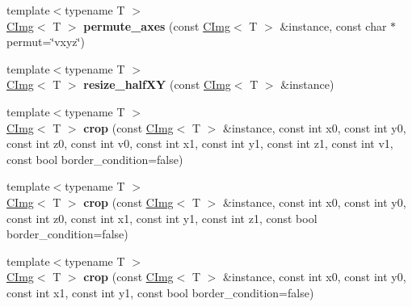 \begin{DoxyCompactItemize}
\item 
\hypertarget{namespacecimg__library_a95ef4b158f977b971aee77f3c5e05891}{{\footnotesize template$<$typename T $>$ }\\\hyperlink{structcimg__library_1_1_c_img}{C\-Img}$<$ T $>$ {\bfseries permute\-\_\-axes} (const \hyperlink{structcimg__library_1_1_c_img}{C\-Img}$<$ T $>$ \&instance, const char $\ast$permut=\char`\"{}vxyz\char`\"{})}\label{namespacecimg__library_a95ef4b158f977b971aee77f3c5e05891}

\item 
\hypertarget{namespacecimg__library_a7d35556fef7e0e3f9e4b15ee2abd7fb1}{{\footnotesize template$<$typename T $>$ }\\\hyperlink{structcimg__library_1_1_c_img}{C\-Img}$<$ T $>$ {\bfseries resize\-\_\-half\-X\-Y} (const \hyperlink{structcimg__library_1_1_c_img}{C\-Img}$<$ T $>$ \&instance)}\label{namespacecimg__library_a7d35556fef7e0e3f9e4b15ee2abd7fb1}

\item 
\hypertarget{namespacecimg__library_a07b4b6077fb4a2d87e80c8a6aeda111f}{{\footnotesize template$<$typename T $>$ }\\\hyperlink{structcimg__library_1_1_c_img}{C\-Img}$<$ T $>$ {\bfseries crop} (const \hyperlink{structcimg__library_1_1_c_img}{C\-Img}$<$ T $>$ \&instance, const int x0, const int y0, const int z0, const int v0, const int x1, const int y1, const int z1, const int v1, const bool border\-\_\-condition=false)}\label{namespacecimg__library_a07b4b6077fb4a2d87e80c8a6aeda111f}

\item 
\hypertarget{namespacecimg__library_afe27f6bc395d4f03678d8986f22145b9}{{\footnotesize template$<$typename T $>$ }\\\hyperlink{structcimg__library_1_1_c_img}{C\-Img}$<$ T $>$ {\bfseries crop} (const \hyperlink{structcimg__library_1_1_c_img}{C\-Img}$<$ T $>$ \&instance, const int x0, const int y0, const int z0, const int x1, const int y1, const int z1, const bool border\-\_\-condition=false)}\label{namespacecimg__library_afe27f6bc395d4f03678d8986f22145b9}

\item 
\hypertarget{namespacecimg__library_a88c7539206a46c4ac3fe47fdb2dc1608}{{\footnotesize template$<$typename T $>$ }\\\hyperlink{structcimg__library_1_1_c_img}{C\-Img}$<$ T $>$ {\bfseries crop} (const \hyperlink{structcimg__library_1_1_c_img}{C\-Img}$<$ T $>$ \&instance, const int x0, const int y0, const int x1, const int y1, const bool border\-\_\-condition=false)}\label{namespacecimg__library_a88c7539206a46c4ac3fe47fdb2dc1608}


\end{DoxyCompactItemize}
